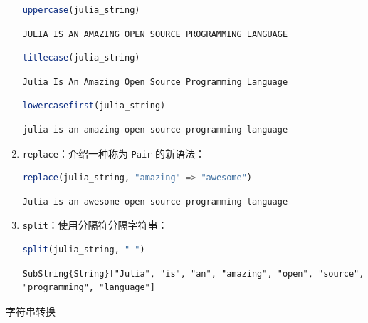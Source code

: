 \documentclass[
  notoc %
]{tufte-book}
\makeatletter
\newcommand{\passthrough}[1]{#1}
\renewcommand\subsubsection{%
\@startsection{subsubsection}{3}{\z@ }{-3.25ex\@plus -1ex \@minus -.2ex}{1.5ex \@plus .2ex}{\normalfont \normalsize \bfseries }
}
\makeatother
\begin{document}
\begin{enumerate}
  \begin{lstlisting}[language=Julia]
  uppercase(julia_string)
  \end{lstlisting}

  \begin{lstlisting}[language=Output]
  JULIA IS AN AMAZING OPEN SOURCE PROGRAMMING LANGUAGE
  \end{lstlisting}

  \begin{lstlisting}[language=Julia]
  titlecase(julia_string)
  \end{lstlisting}

  \begin{lstlisting}[language=Output]
  Julia Is An Amazing Open Source Programming Language
  \end{lstlisting}

  \begin{lstlisting}[language=Julia]
  lowercasefirst(julia_string)
  \end{lstlisting}

  \begin{lstlisting}[language=Output]
  julia is an amazing open source programming language
  \end{lstlisting}
\item
  \passthrough{\lstinline!replace!}：介绍一种称为
  \passthrough{\lstinline!Pair!} 的新语法：

  \begin{lstlisting}[language=Julia]
  replace(julia_string, "amazing" => "awesome")
  \end{lstlisting}

  \begin{lstlisting}[language=Output]
  Julia is an awesome open source programming language
  \end{lstlisting}
\item
  \passthrough{\lstinline!split!}：使用分隔符分隔字符串：

  \begin{lstlisting}[language=Julia]
  split(julia_string, " ")
  \end{lstlisting}

  \begin{lstlisting}[language=Output]
  SubString{String}["Julia", "is", "an", "amazing", "open", "source", "programming", "language"]
  \end{lstlisting}
\end{enumerate}

\hypertarget{sec:string_conversions}{%
\subsubsection{字符串转换}\label{sec:string_conversions}}
\end{document}
